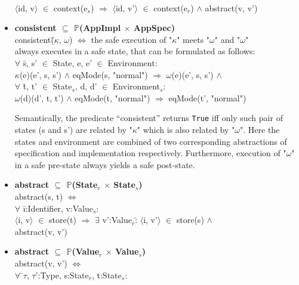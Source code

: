 \documentclass[conference]{IEEEtran}
\begin{document}
\begin{itemize}
\begin{tabbing}
\\\>$\langle$id, v$\rangle$ $\in$ context(e$_s$) $\Rightarrow$ $\langle$id, v'$\rangle$ $\in$ context(e$_r$) $\wedge$ abstract(v, v')
\end{tabbing}
\item \begin{tabbing}\textbf{consistent $\subseteq$ $\mathbb{P}$(AppImpl $\times$ AppSpec)}
\\consistent(\=$\kappa$, $\omega$) $\Leftrightarrow$ the safe execution of "$\kappa$" meets "$\omega$" and "$\omega$" 
\\always executes in a safe state, that can be formulated as follows:
\\ $\forall$ \=s, s' $\in$ State, e, e' $\in$ Environment: 
\\\>\textlbrackdbl $\kappa$\textrbrackdbl(e)(e', s, s') $\wedge$ eqMode(s, "normal") $\Rightarrow$ \textlbrackdbl $\omega$\textrbrackdbl(e)(e', s, s') $\wedge$
\\$\forall$ \=t, t' $\in$ State$_s$, d, d' $\in$ Environment$_s$: 
\\\>\textlbrackdbl $\omega$\textrbrackdbl(d)(d', t, t') $\wedge$ eqMode(t, "normal") $\Rightarrow$ eqMode(t', "normal")
\end{tabbing}
Semantically, the predicate ``consistent'' returns \texttt{True} iff only such pair of states (s and s') are related by "$\kappa$" which is also related by "$\omega$". Here the states and environment are combined of two corresponding abstractions of specification and implementation respectively. Furthermore, execution of "$\omega$" in a safe pre-state always yields a safe post-state.
\item \begin{tabbing}\textbf{abstract $\subseteq$ $\mathbb{P}$(State$_r$ $\times$ State$_s$)}
\\abstract(s, t) $\Leftrightarrow$
\\$\forall$ \=i:Identifier, v:Value$_s$: 
\\\>$\langle$i, v$\rangle$ $\in$ store(t) $\Rightarrow$ $\exists$ v':Value$_r$:\= $\langle$i, v'$\rangle$ $\in$ store(s) $\wedge$ 
\\\>\>abstract(v, v')
\end{tabbing}
\item \begin{tabbing}\textbf{abstract $\subseteq$ $\mathbb{P}$(Value$_r$ $\times$ Value$_s$)}
\\abstract(v, v') $\Leftrightarrow$ 
\\$\forall$ \=$\tau$, $\tau$':Type, s:State$_r$, t:State$_s$: 

\end{tabbing}
\end{itemize}
\end{document}
